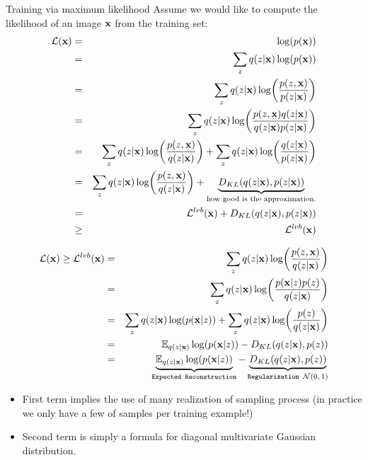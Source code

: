 \documentclass[xcolor=pdftex,dvipsnames,table,mathserif]{beamer}
\begin{document}
\begin{frame}{Training via maximum likelihood}
Assume we would like to compute the likelihood of an image $\mathbf{x}$ from the training set:
\begin{eqnarray*}
\mathcal{L}(\mathbf{x}) &=&\log(p(\mathbf{x})) \\
&=& \sum_{z} q(z|\mathbf{x}) \log(p(\mathbf{x})) \\
&=& \sum_{z} q(z|\mathbf{x}) \log(\frac{p(z,\mathbf{x})}{p(z | \mathbf{x})}) \\
&=& \sum_{z} q(z|\mathbf{x}) \log(\frac{p(z,\mathbf{x}) q(z|\mathbf{x})}{q(z|\mathbf{x}) p(z | \mathbf{x})}) \\
&=&  \sum_{z} q(z|\mathbf{x}) \log(\frac{p(z,\mathbf{x}) }{q(z|\mathbf{x})}) + \sum_{z} q(z|\mathbf{x}) \log(\frac{q(z|\mathbf{x}) }{p(z|\mathbf{x})}) \\
&=& \sum_{z} q(z|\mathbf{x}) \log(\frac{p(z,\mathbf{x}) }{q(z|\mathbf{x})})+ \underbrace{D_{KL}(q(z|\mathbf{x}),p(z|\mathbf{x}))}_{\text{how good is the approximation.}}\\
&=& \mathcal{L}^{lvb}(\mathbf{x})+D_{KL}(q(z|\mathbf{x}),p(z|\mathbf{x})) \\
&\geq& \mathcal{L}^{lvb}(\mathbf{x})
\end{eqnarray*}
\end{frame}


\begin{frame}
\begin{eqnarray*}
 \mathcal{L}(\mathbf{x}) \geq \mathcal{L}^{lvb}(\mathbf{x}) &=& \sum_{z} q(z|\mathbf{x}) \log(\frac{p(z,\mathbf{x}) }{q(z|\mathbf{x})}) \\
 &=& \sum_{z} q(z|\mathbf{x}) \log(\frac{p(\mathbf{x} | z) p(z)}{q(z|\mathbf{x})}) \\
 &=& \sum_{z} q(z|\mathbf{x}) \log(p(\mathbf{x} | z)) +  \sum_{z} q(z|\mathbf{x}) \log(\frac{p(z)}{q(z|\mathbf{x})}) \\
 &=& \mathbb{E}_{q(z|\mathbf{x})} \log(p(\mathbf{x} | z)) -D_{KL}(q(z|\mathbf{x}),p(z))\\
  &=& \underbrace{\mathbb{E}_{q(z|\mathbf{x})} \log(p(\mathbf{x} | z))}_{\texttt{Expected Reconstruction}} - \underbrace{D_{KL}(q(z|\mathbf{x}),p(z))}_{\texttt{Regularization $\mathcal{N}(0,1)$}}\\
\end{eqnarray*}
\begin{itemize}
\item First term implies the use of many realization of sampling process (in practice we only have a few of samples per training example!)
\item Second term is simply a formula for diagonal multivariate Gaussian distribution.
\end{itemize}
\end{frame}
\end{document}
